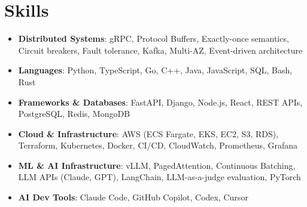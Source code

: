 \documentclass[letterpaper,11pt]{article}
\newcommand{\resumeSubHeadingListStart}{\begin{itemize}[leftmargin=0.15in, label={}]}
\newcommand{\resumeSubHeadingListEnd}{\end{itemize}}
\newcommand{\resumeSkillHeading}[2]{%
  \item\small{\textbf{#1}: #2 \vspace{-9pt}}%
}
\begin{document}
\section{Skills}
  \resumeSubHeadingListStart
    \resumeSkillHeading{Distributed Systems}{gRPC, Protocol Buffers, Exactly-once semantics, Circuit breakers, Fault tolerance, Kafka, Multi-AZ, Event-driven architecture}
    \resumeSkillHeading{Languages}{Python, TypeScript, Go, C++, Java, JavaScript, SQL, Bash, Rust}
    \resumeSkillHeading{Frameworks \& Databases}{FastAPI, Django, Node.js, React, REST APIs, PostgreSQL, Redis, MongoDB}
    \resumeSkillHeading{Cloud \& Infrastructure}{AWS (ECS Fargate, EKS, EC2, S3, RDS), Terraform, Kubernetes, Docker, CI/CD, CloudWatch, Prometheus, Grafana}
    \resumeSkillHeading{ML \& AI Infrastructure}{vLLM, PagedAttention, Continuous Batching, LLM APIs (Claude, GPT), LangChain, LLM-as-a-judge evaluation, PyTorch}
    \resumeSkillHeading{AI Dev Tools}{Claude Code, GitHub Copilot, Codex, Cursor}
  \resumeSubHeadingListEnd
\end{document}
